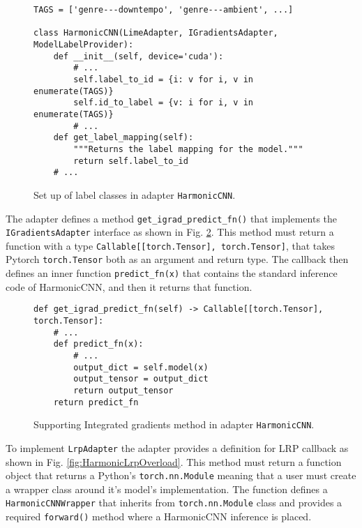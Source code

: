 \documentclass[
    bindingoffset=5mm,  %
    footnoteindent=3mm, %
    hyphenation=true    %
]{src/wut-thesis}
\begin{document}
\begin{figure}[h!]
\begin{verbatim}
TAGS = ['genre---downtempo', 'genre---ambient', ...]

class HarmonicCNN(LimeAdapter, IGradientsAdapter, ModelLabelProvider):
    def __init__(self, device='cuda'):
        # ...
        self.label_to_id = {i: v for i, v in enumerate(TAGS)}
        self.id_to_label = {v: i for i, v in enumerate(TAGS)}
        # ...
    def get_label_mapping(self):
        """Returns the label mapping for the model."""
        return self.label_to_id
    # ...
\end{verbatim}
\caption{Set up of label classes in adapter \texttt{HarmonicCNN}.}
\label{fig:HarmonicLabelMapping}
\end{figure}

The adapter defines a method \texttt{get_igrad_predict_fn()} that implements
the \texttt{IGradientsAdapter} interface as shown in Fig. \ref{fig:HarmonicIgradOverload}.
This method must return a function with a type \texttt{Callable[[torch.Tensor], torch.Tensor]}, %
that takes Pytorch \texttt{torch.Tensor} both as an argument and return type.
The callback then defines an inner function \texttt{predict_fn(x)} that contains
the standard inference code of HarmonicCNN, and then it returns that function.

\begin{figure}%
\begin{verbatim}
def get_igrad_predict_fn(self) -> Callable[[torch.Tensor], torch.Tensor]:
    # ...
    def predict_fn(x):
        # ... 
        output_dict = self.model(x)
        output_tensor = output_dict
        return output_tensor
    return predict_fn
\end{verbatim}
\caption{Supporting Integrated gradients method in adapter \texttt{HarmonicCNN}.}
\label{fig:HarmonicIgradOverload}
\end{figure}

To implement \texttt{LrpAdapter} the adapter provides a definition for LRP
callback as shown in Fig. \ref{fig:HarmonicLrpOverload}. This method must return
a function object that returns a Python's \texttt{torch.nn.Module} meaning
that a user must create a wrapper class around it's model's implementation.
The function defines a \texttt{HarmonicCNNWrapper} that inherits from 
\texttt{torch.nn.Module} class and provides a required
\texttt{forward()} method where a HarmonicCNN inference is placed.
\end{document}
